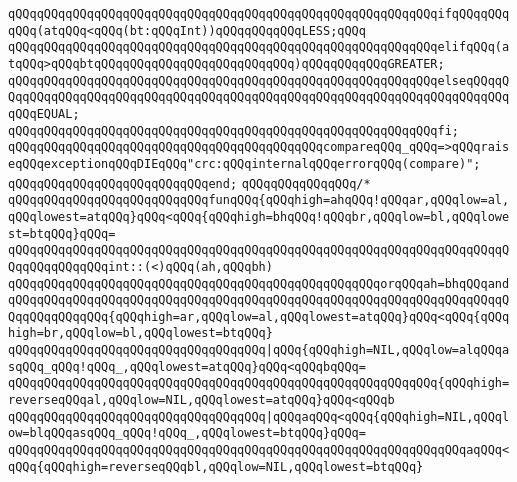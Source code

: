 \verb|qQQqqQQqqQQqqQQqqQQqqQQqqQQqqQQqqQQqqQQqqQQqqQQqqQQqqQQqqQQqifqQQqqQQqqQQq(atqQQq<qQQq(bt:qQQqInt))qQQqqQQqqQQqLESS;qQQq|\newline
\verb|qQQqqQQqqQQqqQQqqQQqqQQqqQQqqQQqqQQqqQQqqQQqqQQqqQQqqQQqqQQqelifqQQq(atqQQq>qQQqbtqQQqqQQqqQQqqQQqqQQqqQQqqQQq)qQQqqQQqqQQqGREATER;|\newline
\verb|qQQqqQQqqQQqqQQqqQQqqQQqqQQqqQQqqQQqqQQqqQQqqQQqqQQqqQQqqQQqelseqQQqqQQqqQQqqQQqqQQqqQQqqQQqqQQqqQQqqQQqqQQqqQQqqQQqqQQqqQQqqQQqqQQqqQQqqQQqqQQqEQUAL;|\newline
\verb|qQQqqQQqqQQqqQQqqQQqqQQqqQQqqQQqqQQqqQQqqQQqqQQqqQQqqQQqqQQqfi;|\newline
\newline
\verb|qQQqqQQqqQQqqQQqqQQqqQQqqQQqqQQqqQQqqQQqqQQqcompareqQQq_qQQq=>qQQqraiseqQQqexceptionqQQqDIEqQQq"crc:qQQqinternalqQQqerrorqQQq(compare)";|\newline
\verb|qQQqqQQqqQQqqQQqqQQqqQQqqQQqend;|\newline
\newline
\verb|qQQqqQQqqQQqqQQq/*|\newline
\verb|qQQqqQQqqQQqqQQqqQQqqQQqqQQqfunqQQq{qQQqhigh=ahqQQq!qQQqar,qQQqlow=al,qQQqlowest=atqQQq}qQQq<qQQq{qQQqhigh=bhqQQq!qQQqbr,qQQqlow=bl,qQQqlowest=btqQQq}qQQq=|\newline
\verb|qQQqqQQqqQQqqQQqqQQqqQQqqQQqqQQqqQQqqQQqqQQqqQQqqQQqqQQqqQQqqQQqqQQqqQQqqQQqqQQqqQQqint::(<)qQQq(ah,qQQqbh)|\newline
\verb|qQQqqQQqqQQqqQQqqQQqqQQqqQQqqQQqqQQqqQQqqQQqqQQqqQQqorqQQqah=bhqQQqand|\newline
\verb|qQQqqQQqqQQqqQQqqQQqqQQqqQQqqQQqqQQqqQQqqQQqqQQqqQQqqQQqqQQqqQQqqQQqqQQqqQQqqQQqqQQq{qQQqhigh=ar,qQQqlow=al,qQQqlowest=atqQQq}qQQq<qQQq{qQQqhigh=br,qQQqlow=bl,qQQqlowest=btqQQq}|\newline
\verb|qQQqqQQqqQQqqQQqqQQqqQQqqQQqqQQqqQQq|\verb#|qQQq{qQQqhigh=NIL,qQQqlow=alqQQqasqQQq_qQQq!qQQq_,qQQqlowest=atqQQq}qQQq<qQQqbqQQq=#\newline
\verb|qQQqqQQqqQQqqQQqqQQqqQQqqQQqqQQqqQQqqQQqqQQqqQQqqQQqqQQqqQQq{qQQqhigh=reverseqQQqal,qQQqlow=NIL,qQQqlowest=atqQQq}qQQq<qQQqb|\newline
\verb|qQQqqQQqqQQqqQQqqQQqqQQqqQQqqQQqqQQq|\verb#|qQQqaqQQq<qQQq{qQQqhigh=NIL,qQQqlow=blqQQqasqQQq_qQQq!qQQq_,qQQqlowest=btqQQq}qQQq=#\newline
\verb|qQQqqQQqqQQqqQQqqQQqqQQqqQQqqQQqqQQqqQQqqQQqqQQqqQQqqQQqqQQqqQQqaqQQq<qQQq{qQQqhigh=reverseqQQqbl,qQQqlow=NIL,qQQqlowest=btqQQq}|\newline
